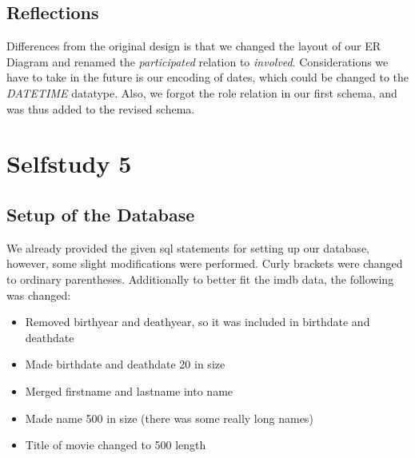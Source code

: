 \documentclass[10pt,a4paper,final]{report}
\begin{document}
\subsection*{Reflections}
Differences from the original design is that we changed the layout of our ER Diagram and renamed the \textit{participated} relation to \textit{involved}.
Considerations we have to take in the future is our encoding of dates, which could be changed to the \textit{DATETIME} datatype.
Also, we forgot the role relation in our first schema, and was thus added to the revised schema.

\section*{Selfstudy 5}
\subsection*{Setup of the Database}
We already provided the given sql statements for setting up our database, however, some slight modifications were performed.
Curly brackets were changed to ordinary parentheses.
Additionally to better fit the imdb data, the following was changed:
\begin{itemize}
     \item Removed birthyear and deathyear, so it was included in birthdate and deathdate
     \item Made birthdate and deathdate 20 in size
     \item Merged firstname and lastname into name
     \item Made name 500 in size (there was some really long names)
     \item Title of movie changed to 500 length
\end{itemize}
\end{document}
